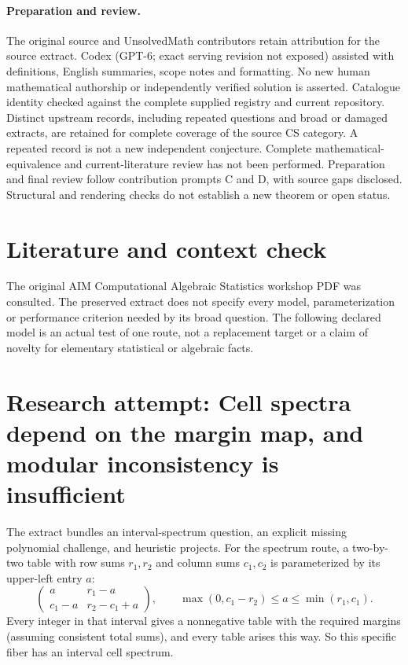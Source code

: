 \documentclass[11pt]{article}
\begin{document}
\paragraph{Preparation and review.}
The original source and UnsolvedMath contributors retain attribution for the source extract. Codex (GPT-6; exact serving revision not exposed) assisted with definitions, English summaries, scope notes and formatting. No new human mathematical authorship or independently verified solution is asserted. Catalogue identity checked against the complete supplied registry and current repository. Distinct upstream records, including repeated questions and broad or damaged extracts, are retained for complete coverage of the source CS category. A repeated record is not a new independent conjecture. Complete mathematical-equivalence and current-literature review has not been performed. Preparation and final review follow contribution prompts C and D, with source gaps disclosed. Structural and rendering checks do not establish a new theorem or open status.
\label{end:statement}

\section{Literature and context check}
The original AIM Computational Algebraic Statistics
 workshop PDF was consulted. The preserved extract does not specify every model,
 parameterization or performance criterion needed by its broad question. The
 following declared model is an actual test of one route, not a replacement
 target or a claim of novelty for elementary statistical or algebraic facts.
\section{Research attempt: Cell spectra depend on the margin map, and modular inconsistency is insufficient}
The extract bundles an interval-spectrum question, an explicit missing
polynomial challenge, and heuristic projects. For the spectrum route, a
two-by-two table with row sums $r_1,r_2$ and column sums $c_1,c_2$ is
parameterized by its upper-left entry $a$:
\[
 \begin{pmatrix}a&r_1-a\\c_1-a&r_2-c_1+a\end{pmatrix},\qquad
 \max(0,c_1-r_2)\le a\le\min(r_1,c_1).
\]
Every integer in that interval gives a nonnegative table with the required
margins (assuming consistent total sums), and every table arises this way.
So this specific fiber has an interval cell spectrum.
\end{document}
